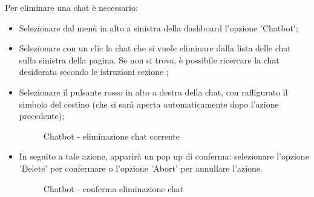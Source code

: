 \documentclass[10pt, a4paper]{article}
\begin{document}
Per eliminare una chat è necessario:
\begin{itemize}
    \item Selezionare dal menù in alto a sinistra della dashboard l'opzione 'Chatbot';
    \item Selezionare con un clic la chat che si vuole eliminare dalla lista delle chat sulla sinistra della pagina. Se non si trova, è possibile ricercare la chat desiderata secondo le istruzioni sezione ;
   
    \item Selezionare il pulsante rosso in alto a destra della chat, con raffigurato il simbolo del cestino (che si sarà aperta automaticamente dopo l'azione precedente);
    \begin{figure}[H]
        \centering  
        \caption{Chatbot - eliminazione chat corrente}
    \end{figure}
    \item In seguito a tale azione, apparirà un pop up di conferma: selezionare l'opzione 'Delete' per confermare o l'opzione 'Abort' per annullare l'azione.
    \begin{figure}[H]
        \centering  
        \caption{Chatbot - conferma eliminazione chat}
    \end{figure}
\end{itemize}
\end{document}
